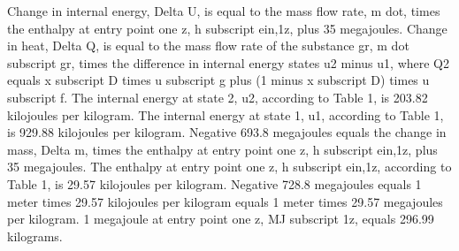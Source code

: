 Change in internal energy, Delta U, is equal to the mass flow rate, m dot, times the enthalpy at entry point one z, h subscript ein,1z, plus 35 megajoules. Change in heat, Delta Q, is equal to the mass flow rate of the substance gr, m dot subscript gr, times the difference in internal energy states u2 minus u1, where Q2 equals x subscript D times u subscript g plus (1 minus x subscript D) times u subscript f. The internal energy at state 2, u2, according to Table 1, is 203.82 kilojoules per kilogram. The internal energy at state 1, u1, according to Table 1, is 929.88 kilojoules per kilogram. Negative 693.8 megajoules equals the change in mass, Delta m, times the enthalpy at entry point one z, h subscript ein,1z, plus 35 megajoules. The enthalpy at entry point one z, h subscript ein,1z, according to Table 1, is 29.57 kilojoules per kilogram. Negative 728.8 megajoules equals 1 meter times 29.57 kilojoules per kilogram equals 1 meter times 29.57 megajoules per kilogram. 1 megajoule at entry point one z, MJ subscript 1z, equals 296.99 kilograms.